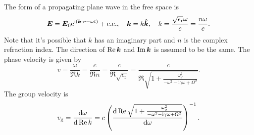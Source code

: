 \documentclass[hyperref, a4paper]{article}
\newcommand*{\ii}{\mathrm{i}}
\newcommand*{\ee}{\mathrm{e}}
\newcommand*{\omegap}{\omega_{\text{p}}}
\newcommand{\epsr}{\epsilon_{\text{r}}}
\begin{document}
The form of a propagating plane wave in the free space is 
\begin{equation}
    \vb*{E} = \vb*{E}_0 \ee^{\ii (\vb*{k} \cdot \vb*{r} - \omega t)} + \text{c.c.}, \quad 
    \vb*{k} = k \vu*{k}, \quad k = \frac{\sqrt{\epsr} \omega}{c} = \frac{n \omega}{c}.
\end{equation}
Note that it's possible that $k$ has an imaginary part 
and $n$ is the complex refraction index.
The direction of $\Re \vb*{k}$ and $\Im \vb*{k}$ 
is assumed to be the same.
The phase velocity is given by 
\begin{equation}
    v = \frac{\omega}{\Re k} = \frac{c}{\Re n} = \frac{c}{\Re \sqrt{\epsr}}
    = \frac{c}{
        \Re \sqrt{
            1 + \frac{\omegap^2}{- \omega^2 - \ii \gamma \omega + \Omega^2}
        }
    }.
\end{equation}
The group velocity is 
\begin{equation}
    v_{\text{g}} = \frac{\dd{\omega}}{\dd{\Re k}}
    = c \left(
        \dv{
            \Re \sqrt{
                1 + \frac{\omegap^2}{- \omega^2 - \ii \gamma \omega + \Omega^2}
            }
        }{\omega}
    \right)^{-1}.
\end{equation}

\subsubsection{}
\end{document}
